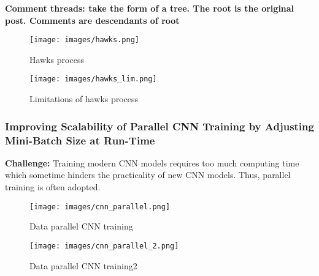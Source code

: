 {\bf Comment threads: take the form of a tree. The root is the original post. Comments are descendants of root}


\begin{figure}
    \centering
    \texttt{[image: images/hawks.png]}
    \caption{Hawks process}
    \label{fig:my_label}
\end{figure}{}

\begin{figure}
    \centering
    \texttt{[image: images/hawks\_lim.png]}
    \caption{Limitations of hawks process}
    \label{fig:my_label}
\end{figure}{}

\subsubsection{Improving Scalability of Parallel CNN Training by Adjusting Mini-Batch Size at Run-Time}

{\bf Challenge:} Training modern CNN models requires too much computing time which sometime hinders the practicality of new CNN models. Thus, parallel training is often adopted.

\begin{figure}
    \centering
    \texttt{[image: images/cnn\_parallel.png]}
    \caption{Data parallel CNN training}
    \label{fig:my_label}
\end{figure}{}

\begin{figure}
    \centering
    \texttt{[image: images/cnn\_parallel\_2.png]}
    \caption{Data parallel CNN training2}
    \label{fig:my_label}
\end{figure}{}



\spacerule